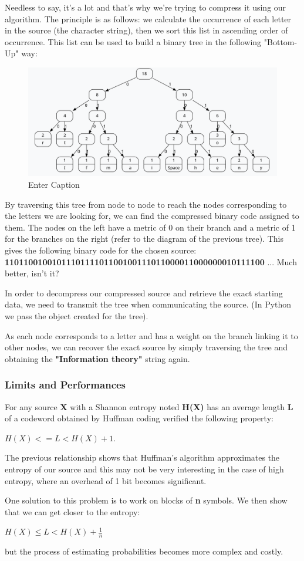 Needless to say, it's a lot and that's why we're trying to compress it using our algorithm.
The principle is as follows: we calculate the occurrence of each letter in the source (the character string), then we sort this list in ascending order of occurrence. This list can be used to build a binary tree in the following "Bottom-Up" way:
\begin{figure}[H]
    \centering
    \includegraphics[width=0.5\linewidth]{images/HuffmanBT.png}
    \caption{Enter Caption}
    \label{fig:huffman-bt}
\end{figure}

By traversing this tree from node to node to reach the nodes corresponding to the letters we are looking for, we can find the compressed binary code assigned to them. The nodes on the left have a metric of 0 on their branch and a metric of 1 for the branches on the right (refer to the diagram of the previous tree). This gives the following binary code for the chosen source: \textbf{1101100100101110111101100100111011000011000000010111100} ... Much better, isn't it?

In order to decompress our compressed source and retrieve the exact starting data, we need to transmit the tree when communicating the source. (In Python we pass the object created for the tree).

As each node corresponds to a letter and has a weight on the branch linking it to other nodes, we can recover the exact source by simply traversing the tree and obtaining the \textbf{"Information theory"} string again.

\subsubsection{Limits and Performances}

For any source \textbf{X} with a Shannon entropy noted \textbf{H(X)} has an average length \textbf{L} of a codeword obtained by Huffman coding verified the following property: 

$H(X) <= L < H(X) + 1$.

The previous relationship shows that Huffman's algorithm approximates the entropy of our source and this may not be very interesting in the case of high entropy, where an overhead of 1 bit becomes significant. 

One solution to this problem is to work on blocks of \textbf{n} symbols. We then show that we can get closer to the entropy: 

$ H(X)\leq L<H(X)+{\frac {1}{n}} $

but the process of estimating probabilities becomes more complex and costly.